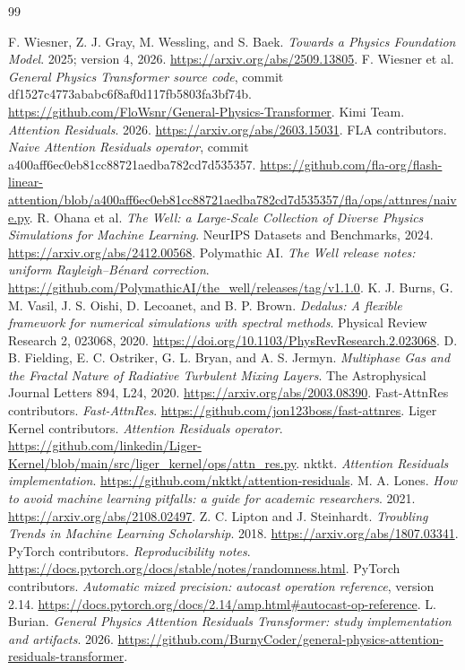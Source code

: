 \begin{thebibliography}{99}
\raggedright
{} F. Wiesner, Z. J. Gray, M. Wessling, and S. Baek. \emph{Towards a Physics Foundation Model}. 2025; version 4, 2026. \url{https://arxiv.org/abs/2509.13805}.
 F. Wiesner et al. \emph{General Physics Transformer source code}, commit df1527c4773ababc6f8af0d117fb5803fa3bf74b. \url{https://github.com/FloWsnr/General-Physics-Transformer}.
 Kimi Team. \emph{Attention Residuals}. 2026. \url{https://arxiv.org/abs/2603.15031}.
 FLA contributors. \emph{Naive Attention Residuals operator}, commit a400aff6ec0eb81cc88721aedba782cd7d535357. \url{https://github.com/fla-org/flash-linear-attention/blob/a400aff6ec0eb81cc88721aedba782cd7d535357/fla/ops/attnres/naive.py}.
 R. Ohana et al. \emph{The Well: a Large-Scale Collection of Diverse Physics Simulations for Machine Learning}. NeurIPS Datasets and Benchmarks, 2024. \url{https://arxiv.org/abs/2412.00568}.
 Polymathic AI. \emph{The Well release notes: uniform Rayleigh--B\'enard correction}. \url{https://github.com/PolymathicAI/the_well/releases/tag/v1.1.0}.
 K. J. Burns, G. M. Vasil, J. S. Oishi, D. Lecoanet, and B. P. Brown. \emph{Dedalus: A flexible framework for numerical simulations with spectral methods}. Physical Review Research 2, 023068, 2020. \url{https://doi.org/10.1103/PhysRevResearch.2.023068}.
 D. B. Fielding, E. C. Ostriker, G. L. Bryan, and A. S. Jermyn. \emph{Multiphase Gas and the Fractal Nature of Radiative Turbulent Mixing Layers}. The Astrophysical Journal Letters 894, L24, 2020. \url{https://arxiv.org/abs/2003.08390}.
 Fast-AttnRes contributors. \emph{Fast-AttnRes}. \url{https://github.com/jon123boss/fast-attnres}.
 Liger Kernel contributors. \emph{Attention Residuals operator}. \url{https://github.com/linkedin/Liger-Kernel/blob/main/src/liger_kernel/ops/attn_res.py}.
 nktkt. \emph{Attention Residuals implementation}. \url{https://github.com/nktkt/attention-residuals}.
 M. A. Lones. \emph{How to avoid machine learning pitfalls: a guide for academic researchers}. 2021. \url{https://arxiv.org/abs/2108.02497}.
 Z. C. Lipton and J. Steinhardt. \emph{Troubling Trends in Machine Learning Scholarship}. 2018. \url{https://arxiv.org/abs/1807.03341}.
 PyTorch contributors. \emph{Reproducibility notes}. \url{https://docs.pytorch.org/docs/stable/notes/randomness.html}.
 PyTorch contributors. \emph{Automatic mixed precision: autocast operation reference}, version 2.14. \url{https://docs.pytorch.org/docs/2.14/amp.html#autocast-op-reference}.
 L. Burian. \emph{General Physics Attention Residuals Transformer: study implementation and artifacts}. 2026. \url{https://github.com/BurnyCoder/general-physics-attention-residuals-transformer}.
\end{thebibliography}
